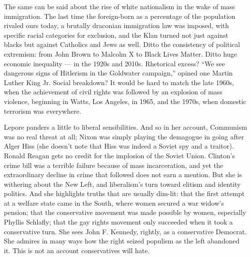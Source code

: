 The same can be said about the rise of white nationalism in the wake of
mass immigration. The last time the foreign-born as a percentage of the
population rivaled ours today, a brutally draconian immigration law was
imposed, with specific racial categories for exclusion, and the Klan
turned not just against blacks but against Catholics and Jews as well.
Ditto the consistency of political extremism: from John Brown to Malcolm
X to Black Lives Matter. Ditto huge economic inequality --- in the 1920s
and 2010s. Rhetorical excess? ``We see dangerous signs of Hitlerism in
the Goldwater campaign,'' opined one Martin Luther King Jr. Social
breakdown? It would be hard to match the late 1960s, when the
achievement of civil rights was followed by an explosion of mass
violence, beginning in Watts, Los Angeles, in 1965, and the 1970s, when
domestic terrorism was everywhere.

Lepore panders a little to liberal sensibilities. And so in her account,
Communism was no real threat at all; Nixon was simply playing the
demagogue in going after Alger Hiss (she doesn't note that Hiss was
indeed a Soviet spy and a traitor). Ronald Reagan gets no credit for the
implosion of the Soviet Union. Clinton's crime bill was a terrible
failure because of mass incarceration, and yet the extraordinary decline
in crime that followed does not earn a mention. But she is withering
about the New Left, and liberalism's turn toward elitism and identity
politics. And she highlights truths that are usually dim-lit: that the
first attempt at a welfare state came in the South, where women secured
a war widow's pension; that the conservative movement was made possible
by women, especially Phyllis Schlafly; that the gay rights movement only
succeeded when it took a conservative turn. She sees John F. Kennedy,
rightly, as a conservative Democrat. She admires in many ways how the
right seized populism as the left abandoned it. This is not an account
conservatives will hate.

